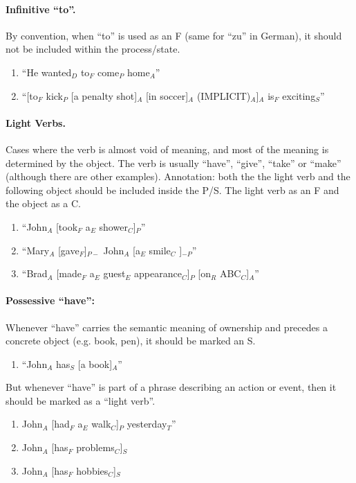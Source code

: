 \documentclass[11pt]{article}
\newcommand{\be}{\begin{enumerate}}
\newcommand{\ee}{\end{enumerate}}
\begin{document}

\paragraph{Infinitive ``to''.} By convention, when ``to'' is used as an F 
(same for ``zu'' in German), it should not be included within the process/state.

\be 
\item
``He wanted$_D$ to$_F$ come$_P$ home$_A$''
\item
``[to$_F$ kick$_P$ [a penalty shot]$_A$ [in soccer]$_A$ (IMPLICIT)$_A$]$_A$ is$_F$ exciting$_S$''
\ee



\paragraph{Light Verbs.} Cases where the verb is almost void of meaning, and most of the meaning is determined by the object. The verb is usually ``have'', ``give'', ``take'' or ``make'' (although there are other examples). Annotation: both the the light verb and the following object should be included inside the P/S. The light verb as an F and the object as a C.
\be \item
``John$_A$ [took$_F$ a$_E$ shower$_C$]$_P$''
\item
``Mary$_A$ [gave$_F$]$_{P-}$ John$_A$ [a$_E$ smile$_C$ ]$_{-P}$''
\item
``Brad$_A$ [made$_F$ a$_E$ guest$_E$ appearance$_C$]$_P$ [on$_R$ ABC$_C$]$_A$''
\ee


\paragraph{Possessive ``have'':} Whenever ``have''  carries the semantic meaning of ownership 
and precedes a concrete object (e.g. book, pen), it should be marked an S.
\be 
\item 
``John$_A$ has$_S$ [a book]$_A$'' 
\ee
But whenever ``have'' is part of a phrase describing an action or event,  then it should be marked as a ``light verb''. 
\be
\item
John$_A$ [had$_F$ a$_E$ walk$_C$]$_P$ yesterday$_T$''
\item
John$_A$ [has$_F$ problems$_C$]$_S$ 
\item
John$_A$ [has$_F$ hobbies$_C$]$_S$
\ee
\end{document}

